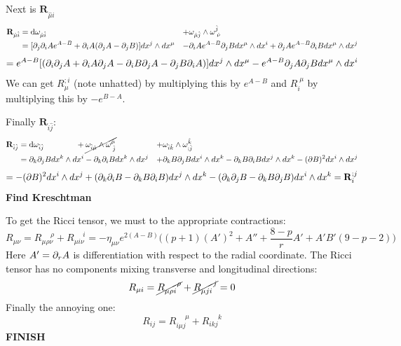 \documentclass[11pt, class=article, crop=false]{standalone}
\begin{document}
\begin{enumerate}
	Next is $\mathbf{R}_{\hat \mu \hat i}$
	\[
	\begin{aligned}
		\mathbf{R}_{\hat \mu \hat i} &= \mathrm{d} \omega_{\hat \mu \hat i} &+& \omega_{\hat \mu \hat j} \wedge \omega^{\hat j}_{\; \hat \nu}\\ 
		&= [\partial_j \partial_i A e^{A-B} + \partial_i A (\partial_j A - \partial_j B)] dx^j \wedge dx^\mu & - & \partial_i A e^{A-B} \partial_j B dx^\mu \wedge dx^i + \partial_j A e^{A-B} \partial_i B dx^\mu \wedge d x^j\\
 	\end{aligned}
	\]
	\[
			= e^{A-B}[(\partial_i \partial_j A + \partial_i A \partial_j A - \partial_i B \partial_j A - \partial_j B \partial_i A)] dx^j \wedge dx^\mu - e^{A-B} \partial_j A \partial_j B dx^\mu \wedge d x^i
	\]
	We can get $R_{\mu}^{;i}$ (note unhatted) by multiplying this by $e^{A-B}$ and $R_{i}^{\; \mu}$ by multiplying this by $- e^{B-A}$. 
	
	Finally $\mathbf{R}_{\hat i \hat j}$:
	\[
	\begin{aligned}
		\mathbf{R}_{\hat i \hat j} &= \mathrm{d} \omega_{\hat i\hat j} \qquad \qquad +  \cancel{\omega_{\hat i \hat \mu} \wedge \omega^{\hat \mu}_{\; \hat j}} &+& \omega_{\hat i \hat k} \wedge \omega^{\hat k}_{; \hat j} \\ 
		&= \partial_k \partial_j B dx^k \wedge dx^i - \partial_k \partial_i B dx^k \wedge dx^j & + & \partial_k B \partial_j B dx^i \wedge dx^k - \partial_k B \partial_i B dx^j \wedge dx^k - (\partial B)^2 dx^i \wedge dx^j \\
 	\end{aligned}
	\]
	\[
		= -(\partial B)^2 dx^i \wedge dx^j + (\partial_k \partial_i B - \partial_k B \partial_i B) dx^j \wedge dx^k - (\partial_k \partial_j B - \partial_k B \partial_j B) dx^i \wedge dx^k = \mathbf{R}_i^{;j}
	\]
	\textbf{Find Kreschtman}
	
	To get the Ricci tensor, we must to the appropriate contractions:
	\[
		R_{\mu \nu} = R_{\mu \rho \nu}^{\; \quad \rho} + R_{\mu i \nu}^{\; \quad i} = - \eta_{\mu \nu} e^{2(A-B)} \Big( (p+1) (A')^2 + A'' + \frac{8-p}{r} A' + A' B' (9-p - 2) \Big)
	\]
	Here $A' = \partial_r A$ is differentiation with respect to the radial coordinate. The Ricci tensor has no components mixing transverse and longitudinal directions: 
	\[
		R_{\mu i} = \cancel{R_{\mu \rho i}^{\; \quad \rho}} + \cancel{ R_{\mu j i}^{\; \quad j}} = 0 
	\]
	Finally the annoying one: 
	\[
		R_{ij} = R_{i \mu j}^{\; \quad \mu} + R_{i k j}^{\; \quad k}
	\]
	\textbf{FINISH}
	

\end{enumerate}
\end{document}
